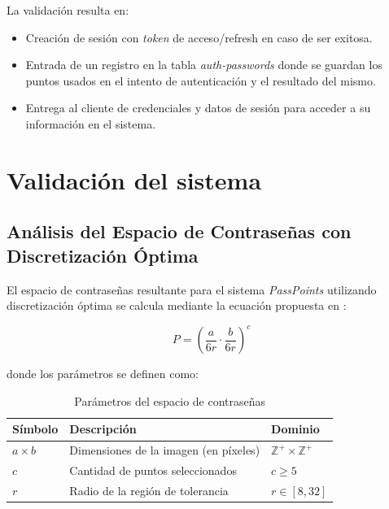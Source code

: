 La validación resulta en:
\begin{itemize}
	\item Creación de sesión con \textit{token} de acceso/refresh en caso de ser exitosa.
	\item Entrada de un registro en la tabla \textit{auth-passwords} donde se guardan los puntos usados en el intento de autenticaci\'on y el resultado del mismo.
	\item Entrega al cliente de credenciales y datos de sesi\'on para acceder a su informaci\'on en el sistema.
\end{itemize}

\section{Validaci\'on del sistema}

\subsection{Análisis del Espacio de Contraseñas con Discretización Óptima}
\label{subsec:espacio-contrasenas}

El espacio de contraseñas resultante para el sistema \textit{PassPoints} utilizando discretización óptima se calcula mediante la ecuación propuesta en \cite{birget2006graphical}:

\begin{equation}
	P = \left( \frac{a}{6r} \cdot \frac{b}{6r} \right)^c
	\label{eq:espacio-contrasenas}
\end{equation}

donde los parámetros se definen como:

\begin{table}[ht]
	\centering
	\caption{Parámetros del espacio de contraseñas}
	\label{tab:parametros-espacio}
	\begin{tabularx}{0.9\textwidth}{lXl}
		\toprule
		\textbf{Símbolo} & \textbf{Descripción} & \textbf{Dominio} \\
		\midrule
		$a \times b$ & Dimensiones de la imagen (en píxeles) & $\mathbb{Z}^+ \times \mathbb{Z}^+$ \\
		$c$ & Cantidad de puntos seleccionados & $c \geq 5$ \\
		$r$ & Radio de la región de tolerancia & $r \in [8, 32]$ \\
		\bottomrule
	\end{tabularx}
\end{table}

\vspace{0.5cm}

